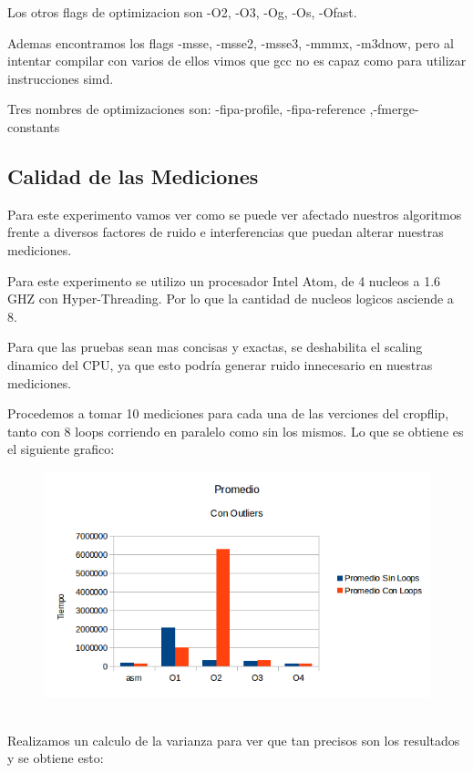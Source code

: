 \documentclass[a4paper]{article}
\begin{document}
Los otros flags de optimizacion son -O2, -O3, -Og, -Os, -Ofast.

Ademas encontramos los flags -msse, -msse2, -msse3, -mmmx, -m3dnow, pero al intentar compilar con varios de ellos vimos que gcc no es capaz como para utilizar instrucciones simd.

Tres nombres de optimizaciones son: -fipa-profile, -fipa-reference ,-fmerge-constants 

\newpage
\subsection{Calidad de las Mediciones}
Para este experimento vamos ver como se puede ver afectado nuestros algoritmos frente a diversos factores de ruido e interferencias que puedan alterar nuestras mediciones.

Para este experimento se utilizo un procesador Intel Atom, de 4 nucleos a 1.6 GHZ con Hyper-Threading. Por lo que la cantidad de nucleos logicos asciende a 8.

Para que las pruebas sean mas concisas y exactas, se deshabilita el scaling dinamico del CPU, ya que esto podría generar ruido innecesario en nuestras mediciones.

Procedemos a tomar 10 mediciones para cada una de las verciones del cropflip, tanto con 8 loops corriendo en paralelo como sin los mismos. Lo que se obtiene es el siguiente grafico:
\\
\begin{figure}[h!]
  \begin{center}
	\includegraphics[scale=0.66]{Graficos1.4/1.3/PCO.png}
	\label{nombreparareferenciar1}
  \end{center}
\end{figure}
\\
Realizamos un calculo de la varianza para ver que tan precisos son los resultados y se obtiene esto:
\end{document}
